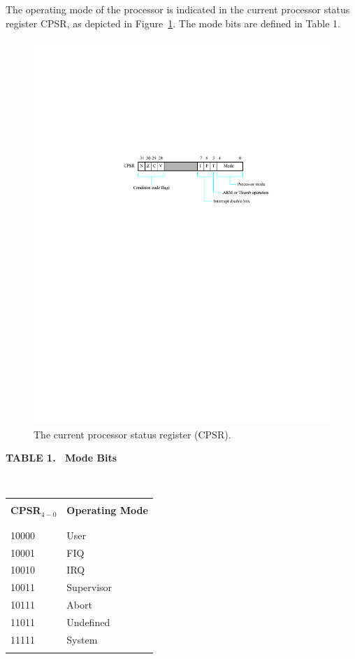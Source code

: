 \documentclass[11pt, twoside, pdftex]{article}
\begin{document}
The operating mode of the processor is indicated in the current processor status register
CPSR, as depicted in Figure~\ref{fig:arm_cpsr}. The mode bits are defined in Table 1. 

\begin{figure}[h!]
   \begin{center}
       \includegraphics{figures/arm_cpsr.pdf}
   \end{center}
   \caption{The current processor status register (CPSR).}
	\label{fig:arm_cpsr}
\end{figure}

\newcommand{\vs}{\rule{0pt}{1ex}\\}

\begin{center}
{\bf TABLE 1. ~Mode Bits}
\vs
\begin{tabular}{ll}
\hline
\vs
{\bf CPSR$_{4-0}$} & {\bf Operating Mode} \\
\vs
\hline
\vs
10000 & User \\
10001 & FIQ \\
10010 & IRQ \\
10011 & Supervisor \\
10111 & Abort \\
11011 & Undefined \\
11111 & System \\
\vs
\hline
\end{tabular}
\end{center}
\end{document}
